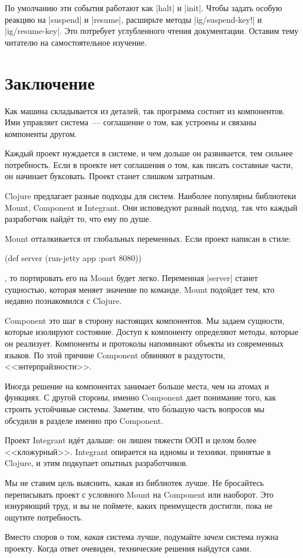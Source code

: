 По умолчанию эти события работают как \spverb|halt| и \spverb|init|. Чтобы
задать особую реакцию на \spverb|suspend| и \spverb|resume|, расширьте методы
\spverb|ig/suspend-key!| и \spverb|ig/resume-key|. Это потребует углубленного
чтения документации. Оставим тему читателю на самостоятельное изучение.

\section{Заключение}

Как машина складывается из деталей, так программа состоит из компонентов. Ими
управляет система~--- соглашение о том, как устроены и связаны компоненты
другом.

Каждый проект нуждается в системе, и чем дольше он развивается, тем сильнее
потребность. Если в проекте нет соглашения о том, как писать составные части, он
начинает буксовать. Проект станет слишком затратным.

Clojure предлагает разные подходы для систем. Наиболее популярны библиотеки
Mount, Component и Integrant. Они исповедуют разный подход, так что каждый
разработчик найд\"{е}т то, что ему по душе.

Mount отталкивается от глобальных переменных. Если проект написан в стиле:

\begin{english}
  \begin{clojure}
(def server (run-jetty app {:port 8080}))
  \end{clojure}
\end{english}

\noindent
, то портировать его на Mount будет легко. Переменная \spverb|server| станет
сущностью, которая меняет значение по команде. Mount подойдет тем, кто недавно
познакомился с Clojure.

Component это шаг в сторону настоящих компонентов. Мы задаем сущности, которые
изолируют состояние. Доступ к компоненту определяют методы, которые он
реализует. Компоненты и протоколы напоминают объекты из современных языков. По
этой причине Component обвиняют в раздутости, <<энтерпрайзности>>.

Иногда решение на компонентах занимает больше места, чем на атомах и функциях. С
другой стороны, именно Component дает понимание того, как строить устойчивые
системы. Заметим, что б\'{о}льшую часть вопросов мы обсудили в разделе именно
про Component.

Проект Integrant ид\"{е}т дальше: он лишен тяжести ООП и целом более
<<кложурный>>. Integrant опирается на идиомы и техники, принятые в Clojure, и
этим подкупает опытных разработчиков.

Мы не ставим цель выяснить, какая из библиотек лучше. Не бросайтесь переписывать
проект с условного Mount на Component или наоборот. Это изнуряющий труд, и вы не
поймете, каких преимуществ достигли, пока не ощутите потребность.

Вместо споров о том, \emph{какая} система лучше, подумайте \emph{зачем} система
нужна проекту. Когда ответ очевиден, технические решения найдутся сами.
